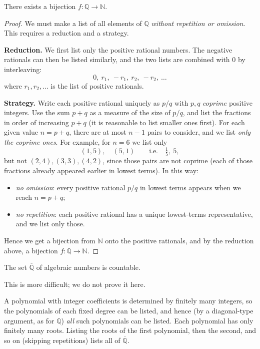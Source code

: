 \documentclass[11pt]{report}
\begin{document}
\begin{thmbox}
There exists a bijection $f: \mathbb{Q} \to \mathbb{N}$.
\end{thmbox}

\begin{proof}
We must make a list of all elements of $\mathbb{Q}$ \emph{without repetition or omission}. This requires a reduction and a strategy.

\textbf{Reduction.} We first list only the positive rational numbers. The negative rationals can then be listed similarly, and the two lists are combined with $0$ by interleaving:
\[
0,\ r_1,\ -r_1,\ r_2,\ -r_2,\ \ldots
\]
where $r_1, r_2, \ldots$ is the list of positive rationals.

\textbf{Strategy.} Write each positive rational uniquely as $p/q$ with $p, q$ \emph{coprime} positive integers. Use the sum $p + q$ as a measure of the size of $p/q$, and list the fractions in order of increasing $p + q$ (it is reasonable to list smaller ones first). For each given value $n = p + q$, there are at most $n - 1$ pairs to consider, and we list \emph{only the coprime ones}. For example, for $n = 6$ we list only
\[
(1,5), \quad (5,1) \qquad \text{i.e.} \quad \tfrac{1}{5},\ 5,
\]
but not $(2,4), (3,3), (4,2)$, since those pairs are not coprime (each of those fractions already appeared earlier in lowest terms). In this way:
\begin{itemize}
    \item \emph{no omission}: every positive rational $p/q$ in lowest terms appears when we reach $n = p + q$;
    \item \emph{no repetition}: each positive rational has a unique lowest-terms representative, and we list only those.
\end{itemize}
Hence we get a bijection from $\mathbb{N}$ onto the positive rationals, and by the reduction above, a bijection $f: \mathbb{Q} \to \mathbb{N}$.
\end{proof}

\begin{thmbox}
The set $\overline{\mathbb{Q}}$ of algebraic numbers is countable.
\end{thmbox}

This is more difficult; we do not prove it here.

\begin{rembox}
A polynomial with integer coefficients is determined by finitely many integers, so the polynomials of each fixed degree can be listed, and hence (by a diagonal-type argument, as for $\mathbb{Q}$) \emph{all} such polynomials can be listed. Each polynomial has only finitely many roots. Listing the roots of the first polynomial, then the second, and so on (skipping repetitions) lists all of $\overline{\mathbb{Q}}$.
\end{rembox}
\end{document}
